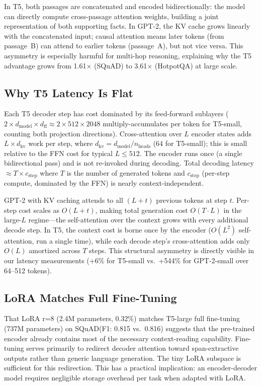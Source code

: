 \documentclass[11pt]{article}
\newcommand{\squad}{SQuAD\xspace}
\begin{document}
In T5, both passages are concatenated and encoded bidirectionally:
the model can directly compute cross-passage attention weights, building a
joint representation of both supporting facts.
In GPT-2, the KV cache grows linearly with the concatenated input;
causal attention means later tokens (from passage~B) can attend to
earlier tokens (passage~A), but not vice versa.
This asymmetry is especially harmful for multi-hop reasoning,
explaining why the T5 advantage grows from 1.61$\times$ (SQuAD) to
3.61$\times$ (HotpotQA) at large scale.

\subsection{Why T5 Latency Is Flat}

Each T5 decoder step has cost dominated by its feed-forward sublayers
($2 \times d_\text{model} \times d_\text{ff} \approx 2 \times 512 \times 2048$
multiply-accumulates per token for T5-small, counting both projection directions).
Cross-attention over $L$ encoder states adds $L \times d_\text{kv}$ work per step,
where $d_\text{kv} = d_\text{model} / n_\text{heads}$ (64 for T5-small);
this is small relative to the FFN cost for typical $L \leq 512$.
The encoder runs once (a single bidirectional pass) and is not re-invoked
during decoding.
Total decoding latency $\approx T \times c_\text{step}$ where $T$ is the number of
generated tokens and $c_\text{step}$ (per-step compute, dominated by the FFN)
is nearly context-independent.

GPT-2 with KV caching attends to all $(L + t)$ previous tokens at step $t$.
Per-step cost scales as $O(L + t)$, making total generation cost $O(T \cdot L)$
in the large-$L$ regime---the self-attention over the context grows with every
additional decode step.
In T5, the context cost is borne once by the encoder ($O(L^2)$ self-attention,
run a single time), while each decode step's cross-attention adds only $O(L)$
amortized across $T$ steps.
This structural asymmetry is directly visible in our latency measurements
(+6\% for T5-small vs.\ +544\% for GPT-2-small over 64--512 tokens).

\subsection{LoRA Matches Full Fine-Tuning}

That LoRA r=8 (2.4M parameters, 0.32\%) matches T5-large full fine-tuning
(737M parameters) on \squad (F1: 0.815 vs.\ 0.816) suggests that the
pre-trained encoder already contains most of the necessary context-reading
capability.
Fine-tuning serves primarily to redirect decoder attention toward span-extractive
outputs rather than generic language generation.
The tiny LoRA subspace is sufficient for this redirection.
This has a practical implication: an encoder-decoder model requires negligible
storage overhead per task when adapted with LoRA.
\end{document}
